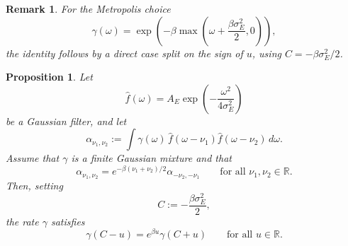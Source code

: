 \documentclass[showpacs,amsmath,amssymb,twocolumn,prx,superscriptaddress,10pt,aps,nofootinbib]{revtex4-2}
\newtheorem{remark}[theorem]{Remark}
\newtheorem{proposition}{Proposition}
\begin{document}
\begin{remark}
For the Metropolis choice
\begin{equation}
\gamma(\omega)=\exp\!\left(-\beta \max\!\left(\omega+\frac{\beta\sigma_E^2}{2},0\right)\right),
\end{equation}
the identity follows by a direct case split on the sign of $u$, using $C=-\beta\sigma_E^2/2$.
\end{remark}

\begin{proposition}
\label{prop:universal_skew_implies_reflection}
Let
\begin{equation}
\hat f(\omega)=A_E\exp\!\left(-\frac{\omega^2}{4\sigma_E^2}\right)
\end{equation}
be a Gaussian filter, and let
\begin{equation}
\alpha_{\nu_1,\nu_2}
:=
\int\gamma(\omega)\,\hat f(\omega-\nu_1)\hat f(\omega-\nu_2)\,d\omega.
\end{equation}
Assume that $\gamma$ is a finite Gaussian mixture and that
\begin{equation}
\label{eq:universal_skew_symmetry}
\alpha_{\nu_1,\nu_2}
=
e^{-\beta(\nu_1+\nu_2)/2}\alpha_{-\nu_2,-\nu_1}
\qquad
\text{for all }\nu_1,\nu_2\in\mathbb R.
\end{equation}
Then, setting
\begin{equation}
C:=-\frac{\beta\sigma_E^2}{2},
\end{equation}
the rate $\gamma$ satisfies
\begin{equation}
\label{eq:reflection_ansatz_again}
\gamma(C-u)=e^{\beta u}\gamma(C+u)
\qquad
\text{for all }u\in\mathbb R.
\end{equation}
\end{proposition}
\end{document}
